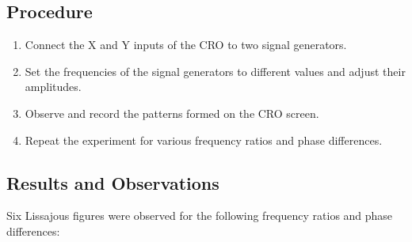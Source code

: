\documentclass[a4paper,12pt]{article}
\begin{document}
\subsection*{Procedure}
\begin{enumerate}
    \item Connect the X and Y inputs of the CRO to two signal generators.
    \item Set the frequencies of the signal generators to different values and adjust their amplitudes.
    \item Observe and record the patterns formed on the CRO screen.
    \item Repeat the experiment for various frequency ratios and phase differences.
\end{enumerate}

\subsection*{Results and Observations}
Six Lissajous figures were observed for the following frequency ratios and phase differences:
\end{document}
